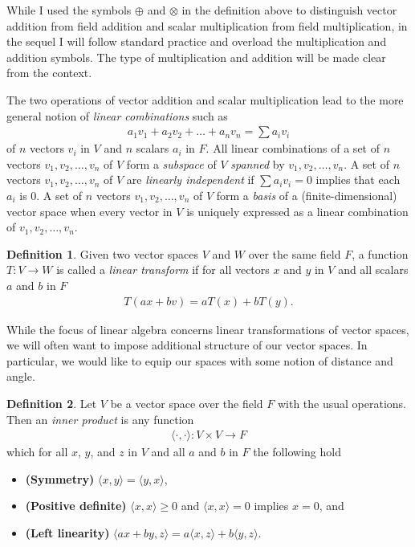 \documentclass[]{article}
\theoremstyle{plain}
\theoremstyle{definition}
\newtheorem{defn}{Definition}
\theoremstyle{remark}
\begin{document}
While I used the symbols $\oplus$ and $\otimes$ in the definition above to
distinguish vector addition from field addition and scalar multiplication from
field multiplication, in the sequel I will follow standard practice and
overload the multiplication and addition symbols.  The type of multiplication
and addition will be made clear from the context.

The two operations of vector addition and scalar multiplication lead to the
more general notion of \emph{linear combinations} such as
\begin{align*}
a_1v_1 + a_2v_2 + \dots + a_nv_n = \sum a_iv_i
\end{align*}
of $n$ vectors $v_i$ in $V$ and $n$ scalars $a_i$ in $F$.
All linear combinations of a set of $n$ vectors $v_1, v_2, \dots, v_n$ of $V$
form a \emph{subspace} of $V$ \emph{spanned} by $v_1, v_2, \dots, v_n$.  A set
of $n$ vectors $v_1, v_2, \dots, v_n$ of $V$ are \emph{linearly independent} if
$\sum a_iv_i = 0$ implies that each $a_i$ is $0$.  A set of $n$ vectors
$v_1, v_2, \dots, v_n$ of $V$ form a \emph{basis} of a (finite-dimensional)
vector space when every vector in $V$ is uniquely expressed as a linear
combination of $v_1, v_2, \dots, v_n$.

\begin{defn}
Given two vector spaces $V$ and $W$ over the same field $F$, a function
$T : V \to W$ is called a \emph{linear transform} if for all vectors
$x$ and $y$ in $V$ and all scalars $a$ and $b$ in $F$
\begin{align*}
T(ax + bv) = aT(x) + bT(y).
\end{align*}
\end{defn}

While the focus of linear algebra concerns linear transformations of
vector spaces, we will often want to impose additional structure of
our vector spaces.  In particular, we would like to equip our spaces
with some notion of distance and angle.

\begin{defn}
Let $V$ be a vector space over the field $F$ with the usual operations.
Then an \emph{inner product} is any function
\begin{align*} 
\langle\cdot,\cdot\rangle : V \times V \to F
\end{align*}
which for all $x$, $y$,
and $z$ in $V$ and all $a$ and $b$ in $F$ the following hold
\begin{itemize}
\item \textbf{(Symmetry)} $\langle x, y\rangle = \langle y, x\rangle$,
\item \textbf{(Positive definite)} $\langle x, x\rangle \ge 0$ and $\langle x, x\rangle = 0$ implies $x=0$, and
\item \textbf{(Left linearity)} $\langle ax +by, z\rangle = a\langle x, z\rangle + b\langle y, z\rangle$.
\end{itemize}
\end{defn}
\end{document}
